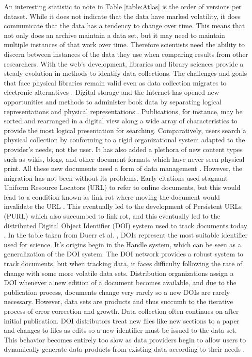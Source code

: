 An interesting statistic to note in Table \ref{table:Atlas} is the order of versions per dataset.
While it does not indicate that the data have marked volatility, it does communicate that the data has a tendency to change over time.
This means that not only does an archive maintain a data set, but it may need to maintain multiple instances of that work over time.
Therefore scientists need the ability to discern between instances of the data they use when comparing results from other researchers.
With the web's development, libraries and library sciences provide a steady evolution in methods to identify data collections.
The challenges and goals that face physical libraries remain valid even as data collection migrates to electronic alternatives \cite{rohtua}.
Digital storage and the Internet has opened new opportunities and methods to administer book data by separating logical representations and physical representations \cite{Barkstrom_digitallibrary}.
Publications, for instance, may be sorted and rearranged in a digital view along a wide array of characteristics to provide the most logical presentation for searching.
Comparatively, users search a physical collection by conforming to a rigid organizational system adapted to the provider's needs, not the user. 
It has also added a plethora of new content types such as wikis, blogs, and other document formats which have never seen physical print.
All these new documents need a form of data management \cite{Berberich:2007:TMT:1277741.1277831}.
However, the migration has not been without its problems.
Early citations used stagnant Uniform Resource Locators (URL) to refer to online documents, but this would lead to a condition known as link rot where moving the document would invalidate the URL \cite{Lyons2005}.
This eventually led to the development of Persistent URLs (PURL) which also succumbed to link rot, and this eventually led to the distributed Digital Object Identifier (DOI) system used to track documents today \cite{Duerr2011}.
In the table taken from Duerr et al. \cite{Duerr2011}, DOIs represent the most suitable identifier used for science.
It's origins begin in the Handle system, which can be seen as a generalization of the DOI system.
The DOI network provides a robust system to track documents, but when tracking data, it faces difficulty following the rate of change with some more volatile data sets.
Distribution organizations assign a DOI whenever a new edition of a document becomes available, and due to the publication process, documents change very rarely so a new DOIs are rarely necessary.
However, data sets are products and thus succumb to the iterative process of error correction and growth.
Data collection often continues on after initial publication.
DOI distributors treat new files like new sections to a paper and changes to files as edits so a new identifier must be issued to the data set.
This behavior becomes entirely too slow as data providers begin to allow users to dynamically generate data products from existing data according to their needs \cite{Barkstrom2003a}.

